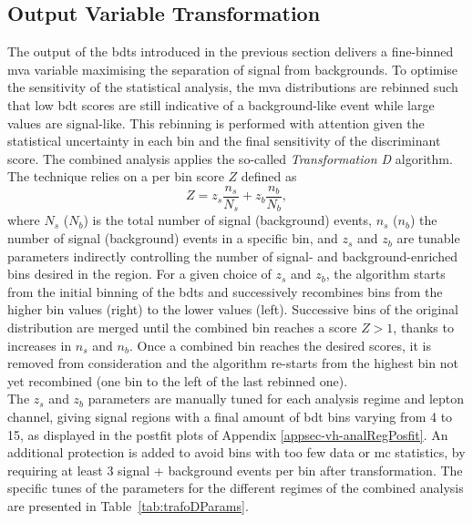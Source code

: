 \subsection{Output Variable Transformation}
The output of the \glspl{bdt} introduced in the previous section delivers a fine-binned \gls{mva} variable maximising the separation of signal from backgrounds. To optimise the sensitivity of the statistical analysis, the \gls{mva} distributions are rebinned such that low \gls{bdt} scores are still indicative of a background-like event while large values are signal-like. This rebinning is performed with attention given the statistical uncertainty in each bin and the final sensitivity of the discriminant score. The combined analysis applies the so-called \textit{Transformation D} algorithm. The technique relies on a per bin score $Z$ defined as
\begin{equation}
    Z = z_s \frac{n_s}{N_s} + z_b \frac{n_b}{N_b},
\end{equation} 
where $N_s$ ($N_b$) is the total number of signal (background) events, $n_s$ ($n_b$) the number of signal (background) events in a specific bin, and $z_s$ and $z_b$ are tunable parameters indirectly controlling the number of signal- and background-enriched bins desired in the region. For a given choice of $z_s$ and $z_b$, the algorithm starts from the initial binning of the \glspl{bdt} and successively recombines bins from the higher bin values (right) to the lower values (left). Successive bins of the original distribution are merged until the combined bin reaches a score $Z > 1$, thanks to increases in $n_s$ and $n_b$. Once a combined bin reaches the desired scores, it is removed from consideration and the algorithm re-starts from the highest bin not yet recombined (one bin to the left of the last rebinned one).\\

The $z_s$ and $z_b$ parameters are manually tuned for each analysis regime and lepton channel, giving signal regions with a final amount of \gls{bdt} bins varying from 4 to 15, as displayed in the postfit plots of Appendix \ref{appsec-vh-analRegPosfit}. An additional protection is added to avoid bins with too few data or \gls{mc} statistics, by requiring at least 3 signal + background events per bin after transformation. The specific tunes of the parameters for the different regimes of the combined analysis are presented in Table~\ref{tab:trafoDParams}.

